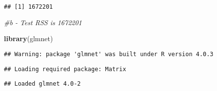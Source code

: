 \documentclass[
]{article}
\newenvironment{Shaded}{\begin{snugshade}}{\end{snugshade}}
\newcommand{\CommentTok}[1]{\textcolor[rgb]{0.56,0.35,0.01}{\textit{#1}}}
\newcommand{\KeywordTok}[1]{\textcolor[rgb]{0.13,0.29,0.53}{\textbf{#1}}}
\newcommand{\NormalTok}[1]{#1}
\begin{document}
\begin{verbatim}
## [1] 1672201
\end{verbatim}

\begin{Shaded}
\begin{Highlighting}[]
\CommentTok{#b - Test RSS is 1672201}

\KeywordTok{library}\NormalTok{(glmnet)}
\end{Highlighting}
\end{Shaded}

\begin{verbatim}
## Warning: package 'glmnet' was built under R version 4.0.3
\end{verbatim}

\begin{verbatim}
## Loading required package: Matrix
\end{verbatim}

\begin{verbatim}
## Loaded glmnet 4.0-2
\end{verbatim}
\end{document}
